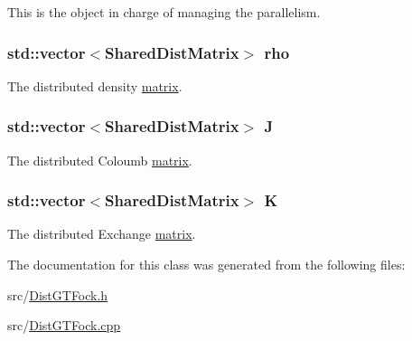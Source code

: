 This is the object in charge of managing the parallelism. \hypertarget{classJKBuilder_1_1DistributionCenter_aea5bfaa6247d7c03edf480fa8ecdd929}{
\subsubsection[{rho}]{\setlength{\rightskip}{0pt plus 5cm}std::vector$<$SharedDistMatrix$>$ {\bf rho}}}
\label{classJKBuilder_1_1DistributionCenter_aea5bfaa6247d7c03edf480fa8ecdd929}


The distributed density \hyperlink{classJKBuilder_1_1matrix}{matrix}. \hypertarget{classJKBuilder_1_1DistributionCenter_a83e7fc1320b7071187dce35322e659b2}{
\subsubsection[{J}]{\setlength{\rightskip}{0pt plus 5cm}std::vector$<$SharedDistMatrix$>$ {\bf J}}}
\label{classJKBuilder_1_1DistributionCenter_a83e7fc1320b7071187dce35322e659b2}


The distributed Coloumb \hyperlink{classJKBuilder_1_1matrix}{matrix}. \hypertarget{classJKBuilder_1_1DistributionCenter_a36d7716ac07910f43805622922c1fb93}{
\subsubsection[{K}]{\setlength{\rightskip}{0pt plus 5cm}std::vector$<$SharedDistMatrix$>$ {\bf K}}}
\label{classJKBuilder_1_1DistributionCenter_a36d7716ac07910f43805622922c1fb93}


The distributed Exchange \hyperlink{classJKBuilder_1_1matrix}{matrix}. 

The documentation for this class was generated from the following files:\begin{DoxyCompactItemize}
\item 
src/\hyperlink{DistGTFock_8h}{DistGTFock.h}\item 
src/\hyperlink{DistGTFock_8cpp}{DistGTFock.cpp}\end{DoxyCompactItemize}

